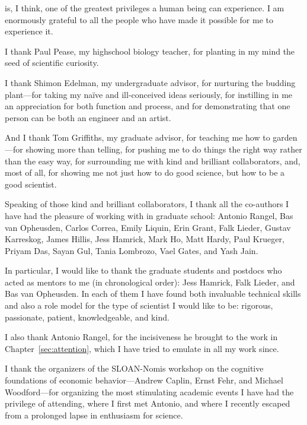 
 is, I think, one of the greatest privileges a human being can experience. I am enormously grateful to all the people who have made it possible for me to experience it.

I thank Paul Pease, my highschool biology teacher, for planting in my mind the seed of scientific curiosity.

I thank Shimon Edelman, my undergraduate advisor, for nurturing the budding plant---for taking my na\"ive and ill-conceived ideas seriously, for instilling in me an appreciation for both function and process, and for demonstrating that one person can be both an engineer and an artist.

And I thank Tom Griffiths, my graduate advisor, for teaching me how to garden---for showing more than telling, for pushing me to do things the right way rather than the easy way, for surrounding me with kind and brilliant collaborators, and, most of all, for showing me not just how to do good science, but how to be a good scientist.

Speaking of those kind and brilliant collaborators, I thank all the co-authors I have had the pleasure of working with in graduate school: Antonio Rangel, Bas van Opheusden, Carlos Correa, Emily Liquin, Erin Grant, Falk Lieder, Gustav Karreskog, James Hillis, Jess Hamrick, Mark Ho, Matt Hardy, Paul Krueger, Priyam Das, Sayan Gul, Tania Lombrozo, Vael Gates, and Yash Jain.

In particular, I would like to thank the graduate students and postdocs who acted as mentors to me (in chronological order): Jess Hamrick, Falk Lieder, and Bas van Opheusden. In each of them I have found both invaluable technical skills and also a role model for the type of scientist I would like to be: rigorous, passionate, patient, knowledgeable, and kind.

I also thank Antonio Rangel, for the incisiveness he brought to the work in Chapter~\ref{sec:attention}, which I have tried to emulate in all my work since.

I thank the organizers of the SLOAN-Nomis workshop on the cognitive foundations of economic behavior---Andrew Caplin, Ernst Fehr, and Michael Woodford---for organizing the most stimulating academic events I have had the privilege of attending, where I first met Antonio, and where I recently escaped from a prolonged lapse in enthusiasm for science.

